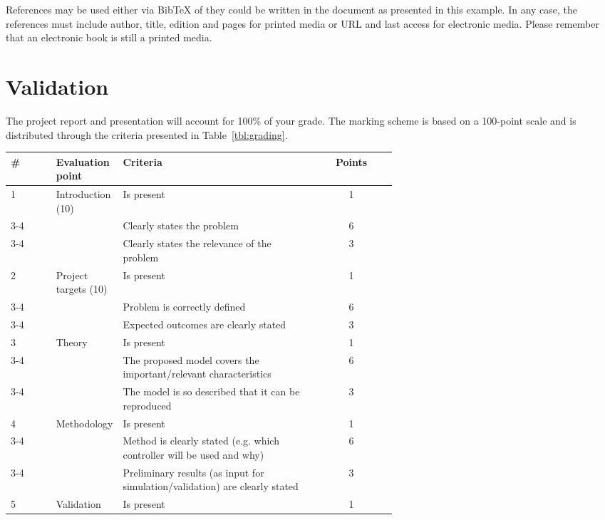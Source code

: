 \documentclass[a4paper, 10pt]{IEEEtran}
\begin{document}
	References may be used either via BibTeX of they could be written in the document as presented in this example. In any case, the references must include author, title, edition and pages for printed media or URL and last access for electronic media. Please remember that an electronic book is still a printed media.
	
	\section{Validation}
	
	The project report and presentation will account for 100\% of your grade. The marking scheme is based on a 100-point scale and is distributed through the criteria presented in Table~\ref{tbl:grading}.
	
	\begin{table*}[h]
		\caption{Grading scheme for projects in SoSe 2020}\label{tbl:grading}
		\centering
		\begin{tabular}{l p{0.13\linewidth} p{0.5\linewidth} c}
			\hline
			\bfseries \# & \bfseries Evaluation point & \bfseries Criteria & \bfseries Points \\
			\hline
			1 & Introduction (10) & Is present & 1 \\
			\cline{3-4}
			 & & Clearly states the problem & 6 \\
			 \cline{3-4}
			 & & Clearly states the relevance of the problem & 3\\
			 \hline
			 2 & Project targets (10) & Is present & 1 \\
			 \cline{3-4}
			 & & Problem is correctly defined & 6 \\
			\cline{3-4}
			 & & Expected outcomes are clearly stated & 3 \\
			 \hline
			 3 & Theory & Is present & 1 \\
			\cline{3-4}
			 & & The proposed model covers the important/relevant characteristics & 6 \\
			\cline{3-4}
			 & & The model is so described that it can be reproduced & 3\\
			 \hline
			 4 & Methodology & Is present & 1 \\
			\cline{3-4}
			 & & Method is clearly stated (e.g. which controller will be used and why) & 6 \\
			\cline{3-4}
			 & & Preliminary results (as input for simulation/validation) are clearly stated & 3\\
			 \hline
			 5 & Validation & Is present & 1 \\

\end{tabular}
\end{table*}
\end{document}
